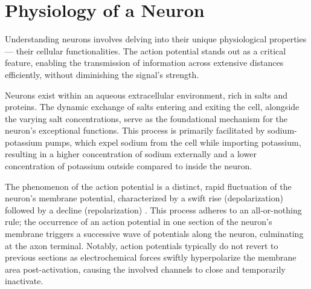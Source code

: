 \documentclass[12pt,a4paper]{report}
\begin{document}
\section{Physiology of a Neuron}

Understanding neurons involves delving into their unique physiological properties — their cellular functionalities. The action potential stands out as a critical feature, enabling the transmission of information across extensive distances efficiently, without diminishing the signal's strength.

Neurons exist within an aqueous extracellular environment, rich in salts and proteins. The dynamic exchange of salts entering and exiting the cell, alongside the varying salt concentrations, serve as the foundational mechanism for the neuron's exceptional functions. This process is primarily facilitated by sodium-potassium pumps, which expel sodium from the cell while importing potassium, resulting in a higher concentration of sodium externally and a lower concentration of potassium outside compared to inside the neuron.

The phenomenon of the action potential is a distinct, rapid fluctuation of the neuron's membrane potential, characterized by a swift rise (depolarization) followed by a decline (repolarization) \cite{HumanAnatomyAndPhysiology}. This process adheres to an all-or-nothing rule; the occurrence of an action potential in one section of the neuron's membrane triggers a successive wave of potentials along the neuron, culminating at the axon terminal. Notably, action potentials typically do not revert to previous sections as electrochemical forces swiftly hyperpolarize the membrane area post-activation, causing the involved channels to close and temporarily inactivate.
\end{document}
